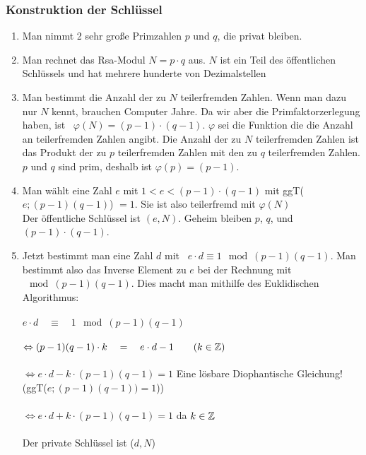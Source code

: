 \subsubsection{Konstruktion der Schlüssel}

\begin{enumerate}
\item Man nimmt 2 sehr große Primzahlen $p$ und $q$, die privat bleiben.\\
\item Man rechnet das Rsa-Modul $N=p \cdot q$ aus. $N$ ist ein Teil des öffentlichen Schlüssels und hat mehrere hunderte von Dezimalstellen\\
\item Man bestimmt die Anzahl der zu $N$ teilerfremden Zahlen. Wenn man dazu nur $N$ kennt, brauchen Computer Jahre. Da wir aber die Primfaktorzerlegung haben, ist \, $\varphi(N) = (p - 1) \cdot (q - 1)$. $\varphi$ sei die Funktion die die Anzahl an teilerfremden Zahlen angibt. Die Anzahl der zu $N$ teilerfremden Zahlen ist das Produkt der zu $p$ teilerfremden Zahlen mit den zu $q$ teilerfremden Zahlen. $p$ und $q$ sind prim, deshalb ist $\varphi(p)=(p - 1)$.
\item Man wählt eine Zahl $e$ mit $1<e<(p-1)\cdot(q-1)$ mit ggT($e;(p-1)(q-1)$) $= 1$. Sie ist also teilerfremd mit $\varphi(N)$\\
Der öffentliche Schlüssel ist $(e,N)$. Geheim bleiben $p$, $q$, und $(p - 1) \cdot (q-1)$.
\item Jetzt bestimmt man eine Zahl $d$ mit \, $e \cdot d \equiv 1 \mod (p-1)(q-1)$. Man bestimmt also das Inverse Element zu $e$ bei der Rechnung mit $\mod (p-1)(q-1)$. Dies macht man mithilfe des Euklidischen Algorithmus:\\\\
$e \cdot d \quad \equiv \quad 1 \mod (p-1)(q-1) $\\\\
$\Leftrightarrow (p-1)(q-1) \cdot k \quad = \quad e \cdot d -1 \qquad (k \in \mathbb{Z})$\\\\
$\Leftrightarrow e \cdot d - k \cdot (p-1)(q-1) = 1$ \qquad Eine lösbare Diophantische Gleichung! (ggT($e;(p-1)(q-1)) = 1$))\\\\
$\Leftrightarrow e \cdot d + k \cdot (p-1)(q-1) = 1$ \qquad da $k \in \mathbb{Z}$\\\\
Der private Schlüssel ist ($d,N$)
\end{enumerate}\\

